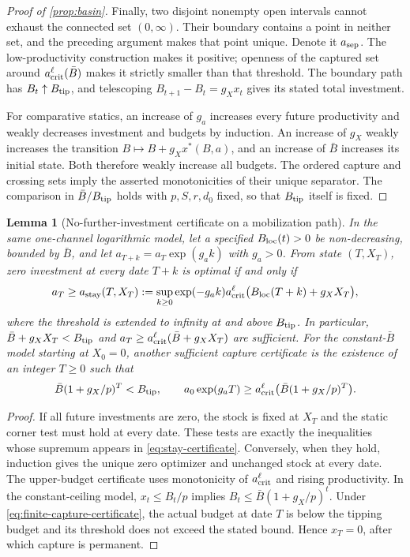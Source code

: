 \documentclass[11pt,a4paper]{article}
\newtheorem{lemma}[proposition]{Lemma}
\theoremstyle{definition}\newtheorem{definition}{Definition}
\begin{document}
\begin{proof}[Proof of \cref{prop:basin}]
Finally, two disjoint nonempty open intervals cannot exhaust the
connected set $(0,\infty)$. Their boundary contains a point in neither
set, and the preceding argument makes that point unique. Denote it
$a_{\rm sep}$. The low-productivity construction makes it positive;
openness of the captured set around $a_{\rm crit}^{\ell}(\bar B)$
makes it strictly smaller than that threshold. The boundary path has
$B_t\uparrow B_{\rm tip}$, and telescoping
$B_{t+1}-B_t=g_Xx_t$ gives its stated total investment.

For comparative statics, an increase of $g_a$ increases every future
productivity and weakly decreases investment and budgets by induction.
An increase of $g_X$ weakly increases the transition
$B\mapsto B+g_Xx^*(B,a)$, and an increase of $\bar B$ increases its
initial state. Both therefore weakly increase all budgets. The ordered
capture and crossing sets imply the asserted monotonicities of their
unique separator. The comparison in $\bar B/B_{\rm tip}$ holds with
$p,S,r,d_0$ fixed, so that $B_{\rm tip}$ itself is fixed.
\end{proof}

\begin{lemma}[No-further-investment certificate on a mobilization path]
\label{lem:stay-certificate}
In the same one-channel logarithmic model, let a specified
$B_{\rm loc}(t)>0$ be non-decreasing, bounded by $\bar B$, and let
$a_{T+k}=a_T\exp(g_ak)$ with $g_a>0$. From state $(T,X_T)$,
zero investment at every date $T+k$ is optimal if and only if
\begin{equation}
 a_T\geq a_{\rm stay}(T,X_T):=
 \sup_{k\geq0}\exp(-g_ak)
 a_{\rm crit}^{\ell}\bigl(B_{\rm loc}(T+k)+g_XX_T\bigr),
 \label{eq:stay-certificate}
\end{equation}
where the threshold is extended to infinity at and above
$B_{\rm tip}$. In particular,
$\bar B+g_XX_T<B_{\rm tip}$ and
$a_T\geq a_{\rm crit}^{\ell}(\bar B+g_XX_T)$ are sufficient.
For the constant-$\bar B$ model starting at $X_0=0$, another sufficient
capture certificate is the existence of an integer $T\geq0$ such that
\begin{equation}
 \bar B(1+g_X/p)^T<B_{\rm tip},\qquad
 a_0\exp(g_aT)\geq
 a_{\rm crit}^{\ell}\bigl(\bar B(1+g_X/p)^T\bigr).
 \label{eq:finite-capture-certificate}
\end{equation}
\end{lemma}
\begin{proof}
If all future investments are zero, the stock is fixed at $X_T$ and
the static corner test must hold at every date. These tests are exactly
the inequalities whose supremum appears in \cref{eq:stay-certificate}.
Conversely, when they hold, induction gives the unique zero optimizer
and unchanged stock at every date. The upper-budget certificate uses
monotonicity of $a_{\rm crit}^{\ell}$ and rising productivity.
In the constant-ceiling model, $x_t\leq B_t/p$ implies
$B_t\leq\bar B(1+g_X/p)^t$. Under
\cref{eq:finite-capture-certificate}, the actual budget at date $T$
is below the tipping budget and its threshold does not exceed the
stated bound. Hence $x_T=0$, after which capture is permanent.
\end{proof}
\end{document}
